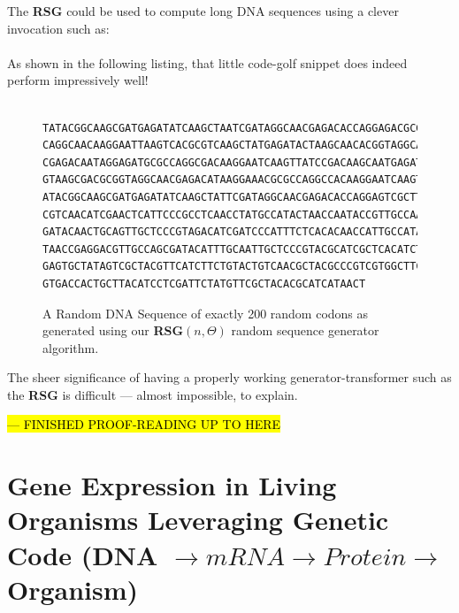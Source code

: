 \documentclass[a4paper, 18pt]{book} %
\begin{document}
The \textbf{RSG} could be used to compute long DNA sequences using a clever invocation such as:\\


\\

As shown in the following listing, that little code-golf snippet does indeed perform impressively well!

\begin{figure}[H]
  \begin{center}
  \begin{lstlisting}[caption={A RANDOM DNA SEQUENCE}, label={LST_RANDSEQ}, frame=single, numbers=none, basicstyle=\ttfamily,  commentstyle=\color{blue}]

TATACGGCAAGCGATGAGATATCAAGCTAATCGATAGGCAACGAGACACCAGGAGACGCGT
CAGGCAACAAGGAATTAAGTCACGCGTCAAGCTATGAGATACTAAGCAACACGGTAGGCAA
CGAGACAATAGGAGATGCGCCAGGCGACAAGGAATCAAGTTATCCGACAAGCAATGAGATA
GTAAGCGACGCGGTAGGCAACGAGACATAAGGAAACGCGCCAGGCCACAAGGAATCAAGTT
ATACGGCAAGCGATGAGATATCAAGCTATTCGATAGGCAACGAGACACCAGGAGTCGCTTC
CGTCAACATCGAACTCATTCCCGCCTCAACCTATGCCATACTAACCAATACCGTTGCCAAC
GATACAACTGCAGTTGCTCCCGTAGACATCGATCCCATTTCTCACACAACCATTGCCATAG
TAACCGAGGACGTTGCCAGCGATACATTTGCAATTGCTCCCGTACGCATCGCTCACATCTT
GAGTGCTATAGTCGCTACGTTCATCTTCTGTACTGTCAACGCTACGCCCGTCGTGGCTTCT
GTGACCACTGCTTACATCCTCGATTCTATGTTCGCTACACGCATCATAACT

\end{lstlisting}
  \end{center}
  \caption{A Random DNA Sequence of exactly 200 random codons as generated using our \textbf{RSG}$(n,\Theta)$ random sequence generator algorithm.}
  \label{RandomDNASEQ}
\end{figure}

The sheer significance of having a properly working generator-transformer such as the \textbf{RSG} is difficult --- almost impossible, to explain. 


\hl{--- FINISHED PROOF-READING UP TO HERE}


\chapter{Gene Expression in Living Organisms Leveraging Genetic Code (DNA $\rightarrow mRNA \rightarrow Protein \rightarrow$ Organism)}
\label{SEC05}
\end{document}
